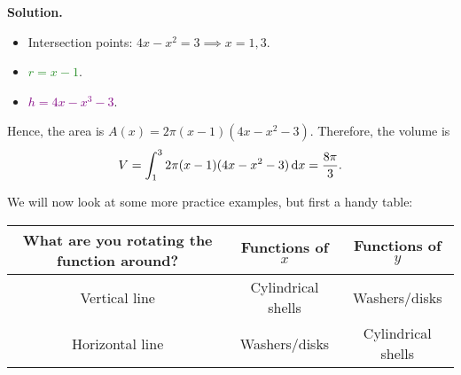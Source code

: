 \begin{Example}{}{}
\begin{enumerate}[label=(\roman*)]
\begin{center}
              \end{center}
              \textbf{Solution.}
              \begin{itemize}
                  \item Intersection points: $ 4x-x^2=3\implies x=1,3 $.
                  \item \textcolor{ForestGreen}{$ r=x-1 $}.
                  \item \textcolor{Purple}{$ h=4x-x^3-3 $}.
              \end{itemize}
              Hence, the area is $ A(x)=2\pi(x-1)(4x-x^2-3) $. Therefore, the volume is
              \[ V
                  =\int_{1}^{3}2\pi(x-1)(4x-x^2-3)\odif{x}
                  =\frac{8\pi}{3}. \]
    \end{enumerate}
\end{Example}

We will now look at some more practice examples, but first a handy table:

\begin{table}[!htbp]
    \centering
    \begin{tabular}{ccc}
        What are you rotating the function around? & Functions of $ x $ & Functions of $ y $ \\
        \midrule
        Vertical line                              & Cylindrical shells & Washers/disks      \\
        Horizontal line                            & Washers/disks      & Cylindrical shells
    \end{tabular}
\end{table}

